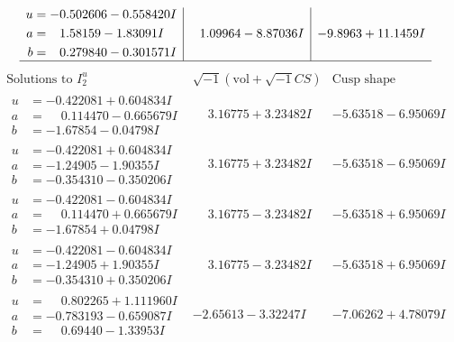\documentclass[1p]{elsarticle_modified}
\theoremstyle{definition}
\newcommand{\I}{\sqrt{-1}}
\begin{document}
$$\begin{array}{c|c|c}
\begin{aligned}
u &= -0.502606 - 0.558420 I \\
a &= \phantom{-}1.58159 - 1.83091 I \\
b &= \phantom{-}0.279840 - 0.301571 I\end{aligned}
 & \phantom{-}1.09964 - 8.87036 I & -9.8963 + 11.1459 I\\
 \hline 
 \end{array}$$\newpage$$\begin{array}{c|c|c}  
\text{Solutions to }I^u_{2}& \I (\text{vol} + \sqrt{-1}CS) & \text{Cusp shape}\\
 \hline 
\begin{aligned}
u &= -0.422081 + 0.604834 I \\
a &= \phantom{-}0.114470 - 0.665679 I \\
b &= -1.67854 - 0.04798 I\end{aligned}
 & \phantom{-}3.16775 + 3.23482 I & -5.63518 - 6.95069 I \\ \hline\begin{aligned}
u &= -0.422081 + 0.604834 I \\
a &= -1.24905 - 1.90355 I \\
b &= -0.354310 - 0.350206 I\end{aligned}
 & \phantom{-}3.16775 + 3.23482 I & -5.63518 - 6.95069 I \\ \hline\begin{aligned}
u &= -0.422081 - 0.604834 I \\
a &= \phantom{-}0.114470 + 0.665679 I \\
b &= -1.67854 + 0.04798 I\end{aligned}
 & \phantom{-}3.16775 - 3.23482 I & -5.63518 + 6.95069 I \\ \hline\begin{aligned}
u &= -0.422081 - 0.604834 I \\
a &= -1.24905 + 1.90355 I \\
b &= -0.354310 + 0.350206 I\end{aligned}
 & \phantom{-}3.16775 - 3.23482 I & -5.63518 + 6.95069 I \\ \hline\begin{aligned}
u &= \phantom{-}0.802265 + 1.111960 I \\
a &= -0.783193 - 0.659087 I \\
b &= \phantom{-}0.69440 - 1.33953 I\end{aligned}
 & -2.65613 - 3.32247 I & -7.06262 + 4.78079 I \\ \hline\begin{aligned}

\end{aligned}
\end{array}$$
\end{document}
